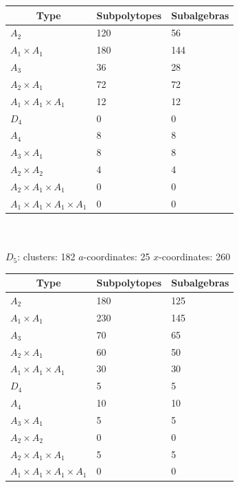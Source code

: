 \documentclass[11pt]{article}
\begin{document}
\begin{tabular}{ | l | l | l |}
\multicolumn{1}{c}{Type} &  \multicolumn{1}{c}{Subpolytopes}  &  \multicolumn{1}{c}{Subalgebras} \\
\hline \(A_2\) & 120 & 56 \\ 
\hline \(A_1 \times A_1\) & 180 & 144 \\ \hline 
\hline \(A_3\) & 36 & 28 \\ 
\hline \(A_2 \times A_1\) & 72 & 72 \\ 
\hline \(A_1 \times A_1 \times A_1\) & 12 & 12 \\ \hline 
\hline \(D_4\) & 0 & 0 \\ 
\hline \(A_4\) & 8 & 8 \\ 
\hline \(A_3 \times A_1\) & 8 & 8 \\ 
\hline \(A_2 \times A_2\) & 4 & 4 \\ 
\hline \(A_2 \times A_1 \times A_1\) & 0 & 0 \\ 
\hline \(A_1 \times A_1 \times A_1 \times A_1\) & 0 & 0 \\ 
\hline
\end{tabular} \\ \\


{\Large\underline{\(D_5\)}:} \quad clusters: 182 \qquad \(a\)-coordinates: 25 \qquad \(x\)-coordinates: 260\\

\begin{tabular}{ | l | l | l |}
\multicolumn{1}{c}{Type} &  \multicolumn{1}{c}{Subpolytopes}  &  \multicolumn{1}{c}{Subalgebras} \\
\hline \(A_2\) & 180 & 125 \\ 
\hline \(A_1 \times A_1\) & 230 & 145 \\ \hline 
\hline \(A_3\) & 70 & 65 \\ 
\hline \(A_2 \times A_1\) & 60 & 50 \\ 
\hline \(A_1 \times A_1 \times A_1\) & 30 & 30 \\ \hline 
\hline \(D_4\) & 5 & 5 \\ 
\hline \(A_4\) & 10 & 10 \\ 
\hline \(A_3 \times A_1\) & 5 & 5 \\ 
\hline \(A_2 \times A_2\) & 0 & 0 \\ 
\hline \(A_2 \times A_1 \times A_1\) & 5 & 5 \\ 
\hline \(A_1 \times A_1 \times A_1 \times A_1\) & 0 & 0 \\ 
\hline
\end{tabular} \\ \\ 
\end{document}
